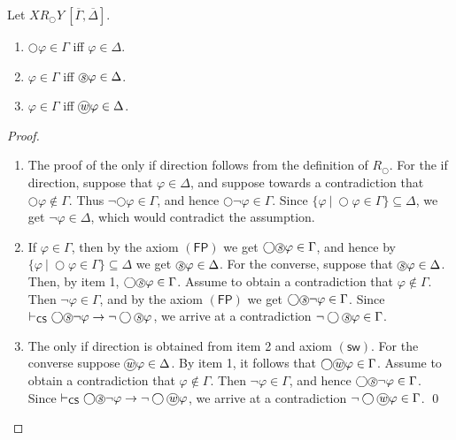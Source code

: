 \documentclass[envcountsect,envcountsame,oribibl,orivec]{llncs}
\newcommand*\circled[1]{\tikz[baseline=(char.base)]{
		\node[shape=circle,draw,inner sep=0.4pt] (char) {#1};}}
\newcommand{\lnext}{\bigcirc}
\newcommand{\wprevious}{\circled{\textit{w}}}
\newcommand{\sprevious}{\circled{\textit{s}}}
\newcommand{\swprevax}{\ensuremath{(\textsf{sw})}}
\newcommand{\fpax}{\ensuremath{(\textsf{FP})}}
\newcommand{\CS}{\textsf{CS}}
\renewcommand{\phi}{\varphi}
\newcommand{\RO}[4]{#1 R_\lnext #2\ [#3, #4]}
\begin{document}
\begin{lemma}\label{lem:R-next}
	Let $\RO{X}{Y}{\overline{\Gamma}}{\overline{\Delta}}$.
	\begin{enumerate}
		\item  $\lnext \phi \in \Gamma$ if{f} $\phi \in \Delta$.
		
		\item $\phi \in \Gamma$ if{f} $\sprevious \phi \in \Delta$.
		
		\item $\phi \in \Gamma$ if{f} $\wprevious \phi \in \Delta$.
	\end{enumerate}
\end{lemma}
\begin{proof}
	\begin{enumerate}
		\item The proof of the only if direction follows from the definition of $R_\lnext$. For the if direction, suppose that $\phi \in \Delta$, and suppose towards a contradiction that $\lnext \phi \not \in \Gamma$. Thus $\neg \lnext \phi \in \Gamma$, and hence $\lnext \neg \phi \in \Gamma$. Since $\{ \phi \ |\  \lnext \phi \in \Gamma\} \subseteq \Delta$, we get  $\neg \phi \in \Delta$, which would contradict the assumption.
		
		\item If $\phi \in \Gamma$, then by the axiom $\fpax$ we get $\lnext \sprevious\phi \in \Gamma$, and hence by $\{ \phi \ |\  \lnext \phi \in \Gamma\} \subseteq \Delta$ we get $\sprevious \phi \in \Delta$. For the converse, suppose that $\sprevious \phi \in \Delta$. Then, by item 1, $\lnext \sprevious \phi \in \Gamma$. Assume to obtain a contradiction that  $\phi \not \in \Gamma$. Then $\neg \phi \in \Gamma$, and by the axiom $\fpax$ we get  $\lnext \sprevious \neg \phi \in \Gamma$. Since $\vdash_\CS \lnext \sprevious \neg \phi \rightarrow \neg \lnext \sprevious  \phi$, we arrive at a contradiction  $\neg \lnext \sprevious  \phi \in \Gamma$.
		
		\item The only if direction is obtained from item 2 and axiom $\swprevax$. For the converse suppose $\wprevious \phi \in \Delta$. By item 1, it follows that $\lnext \wprevious \phi \in \Gamma$. Assume to obtain a contradiction that $\phi \not \in \Gamma$. Then $\neg \phi \in \Gamma$, and hence $\lnext \sprevious \neg \phi \in \Gamma$. Since $\vdash_\CS \lnext \sprevious \neg \phi \rightarrow \neg \lnext \wprevious \phi$, we arrive at a contradiction $\neg \lnext \wprevious \phi \in \Gamma$.     \qed
	\end{enumerate}
\end{proof}
\end{document}
